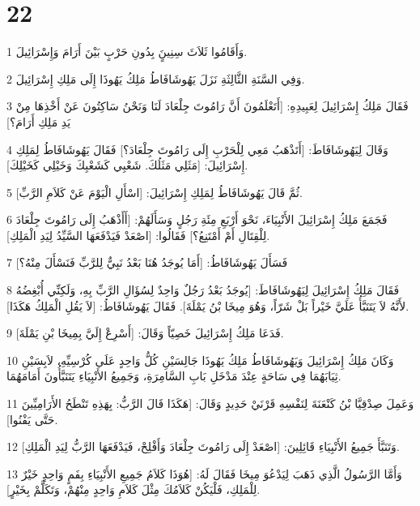 \chapter{22}

\par 1 وَأَقَامُوا ثَلاَثَ سِنِينٍَ بِدُونِ حَرْبٍ بَيْنَ أَرَامَ وَإِسْرَائِيلَ.
\par 2 وَفِي السَّنَةِ الثَّالِثَةِ نَزَلَ يَهُوشَافَاطُ مَلِكُ يَهُوذَا إِلَى مَلِكِ إِسْرَائِيلَ.
\par 3 فَقَالَ مَلِكُ إِسْرَائِيلَ لِعَبِيدِهِ: [أَتَعْلَمُونَ أَنَّ رَامُوتَ جِلْعَادَ لَنَا وَنَحْنُ سَاكِتُونَ عَنْ أَخْذِهَا مِنْ يَدِ مَلِكِ أَرَامَ؟]
\par 4 وَقَالَ لِيَهُوشَافَاطَ: [أَتَذْهَبُ مَعِي لِلْحَرْبِ إِلَى رَامُوتَ جِلْعَادَ؟] فَقَالَ يَهُوشَافَاطُ لِمَلِكِ إِسْرَائِيلَ: [مَثَلِي مَثَلُكَ. شَعْبِي كَشَعْبِكَ وَخَيْلِي كَخَيْلِكَ].
\par 5 ثُمَّ قَالَ يَهُوشَافَاطُ لِمَلِكِ إِسْرَائِيلَ: [اسْأَلِ الْيَوْمَ عَنْ كَلاَمِ الرَّبِّ].
\par 6 فَجَمَعَ مَلِكُ إِسْرَائِيلَ الأَنْبِيَاءَ، نَحْوَ أَرْبَعِ مِئَةِ رَجُلٍ وَسَأَلَهُمْ: [أَأَذْهَبُ إِلَى رَامُوتَ جِلْعَادَ لِلْقِتَالِ أَمْ أَمْتَنِعُ؟] فَقَالُوا: [اصْعَدْ فَيَدْفَعَهَا السَّيِّدُ لِيَدِ الْمَلِكِ].
\par 7 فَسَأَلَ يَهُوشَافَاطُ: [أَمَا يُوجَدُ هُنَا بَعْدُ نَبِيٌّ لِلرَّبِّ فَنَسْأَلَ مِنْهُ؟]
\par 8 فَقَالَ مَلِكُ إِسْرَائِيلَ لِيَهُوشَافَاطَ: [يُوجَدُ بَعْدُ رَجُلٌ وَاحِدٌ لِسُؤَالِ الرَّبِّ بِهِ، وَلَكِنِّي أُبْغِضُهُ لأَنَّهُ لاَ يَتَنَبَّأُ عَلَيَّ خَيْراً بَلْ شَرّاً، وَهُوَ مِيخَا بْنُ يَمْلَةَ]. فَقَالَ يَهُوشَافَاطُ: [لاَ يَقُلِ الْمَلِكُ هَكَذَا].
\par 9 فَدَعَا مَلِكُ إِسْرَائِيلَ خَصِيّاً وَقَالَ: [أَسْرِعْ إِلَيَّ بِمِيخَا بْنِ يَمْلَةَ].
\par 10 وَكَانَ مَلِكُ إِسْرَائِيلَ وَيَهُوشَافَاطُ مَلِكُ يَهُوذَا جَالِسَيْنِ كُلُّ وَاحِدٍ عَلَى كُرْسِيِّهِ، لاَبِسَيْنِ ثِيَابَهُمَا فِي سَاحَةٍ عِنْدَ مَدْخَلِ بَابِ السَّامِرَةِ، وَجَمِيعُ الأَنْبِيَاءِ يَتَنَبَّأُونَ أَمَامَهُمَا.
\par 11 وَعَمِلَ صِدْقِيَّا بْنُ كَنْعَنَةَ لِنَفْسِهِ قَرْنَيْ حَدِيدٍ وَقَالَ: [هَكَذَا قَالَ الرَّبُّ: بِهَذِهِ تَنْطَحُ الأَرَامِيِّينَ حَتَّى يَفْنُوا].
\par 12 وَتَنَبَّأَ جَمِيعُ الأَنْبِيَاءِ قَائِلِينَ: [اصْعَدْ إِلَى رَامُوتَ جِلْعَادَ وَأَفْلِحْ، فَيَدْفَعَهَا الرَّبُّ لِيَدِ الْمَلِكِ].
\par 13 وَأَمَّا الرَّسُولُ الَّذِي ذَهَبَ لِيَدْعُوَ مِيخَا فَقَالَ لَهُ: [هُوَذَا كَلاَمُ جَمِيعِ الأَنْبِيَاءِ بِفَمٍ وَاحِدٍ خَيْرٌ لِلْمَلِكِ، فَلْيَكُنْ كَلاَمُكَ مِثْلَ كَلاَمِ وَاحِدٍ مِنْهُمْ، وَتَكَلَّمْ بِخَيْرٍ].
